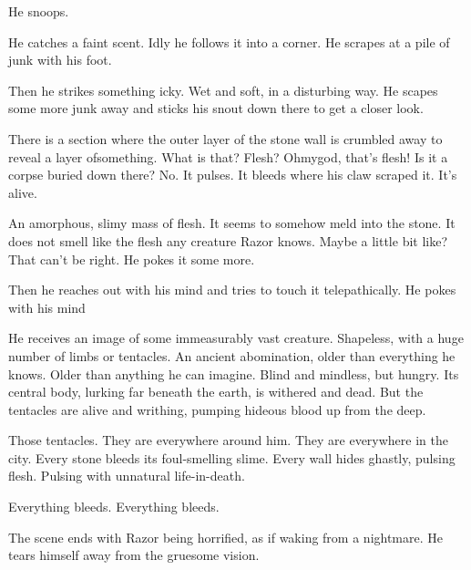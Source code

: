 He snoops.

He catches a faint scent. 
Idly he follows it into a corner. 
He scrapes at a pile of junk with his foot. 

Then he strikes something icky. 
Wet and soft, in a disturbing way. 
He scapes some more junk away and sticks his snout down there to get a closer look. 

There is a section where the outer layer of the stone wall is crumbled away to reveal a layer of\prikker something.
What is that? 
Flesh?
Ohmygod, that's flesh!
Is it a corpse buried down there?
No. 
It pulses. 
It bleeds where his claw scraped it. 
It's alive. 

An amorphous, slimy mass of flesh. 
It seems to somehow meld into the stone. 
It does not smell like the flesh any creature Razor knows. 
Maybe a little bit like\prikker \scatha? 
That can't be right. 
He pokes it some more. 

Then he reaches out with his mind and tries to touch it telepathically. 
He pokes with his mind\prikker 

\begin{dream}
  He receives an image of some immeasurably vast creature. 
  Shapeless, with a huge number of limbs or tentacles. 
  An ancient abomination, older than everything he knows. 
  Older than anything he can imagine. 
  Blind and mindless, but hungry. 
  Its central body, lurking far beneath the earth, is withered and dead.
  But the tentacles are alive and writhing, pumping hideous blood up from the deep. 
  
  Those tentacles. 
  They are everywhere around him. 
  They are everywhere in the city. 
  Every stone bleeds its foul-smelling slime. 
  Every wall hides ghastly, pulsing flesh. 
  Pulsing with unnatural life-in-death. 
  
  Everything bleeds. 
  Everything bleeds. 
\end{dream}

The scene ends with Razor being horrified, as if waking from a nightmare. 
He tears himself away from the gruesome vision.







